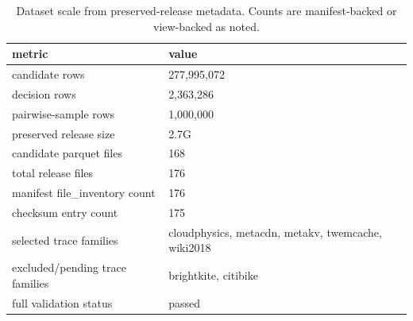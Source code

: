 \begin{table}[t]
  \centering
  \footnotesize
  \caption{Dataset scale from preserved-release metadata. Counts are manifest-backed or view-backed as noted.}
  \label{tab:dataset-scale}
  \begin{tabularx}{\columnwidth}{@{}P{0.43\columnwidth}L@{}}
    \toprule
    metric & value \\
    \midrule
    candidate rows & 277,995,072 \\
    decision rows & 2,363,286 \\
    pairwise-sample rows & 1,000,000 \\
    preserved release size & 2.7G \\
    candidate parquet files & 168 \\
    total release files & 176 \\
    manifest file\_inventory count & 176 \\
    checksum entry count & 175 \\
    selected trace families & cloudphysics, metacdn, metakv, twemcache, wiki2018 \\
    excluded/pending trace families & brightkite, citibike \\
    full validation status & passed \\
    \bottomrule
  \end{tabularx}
\end{table}
